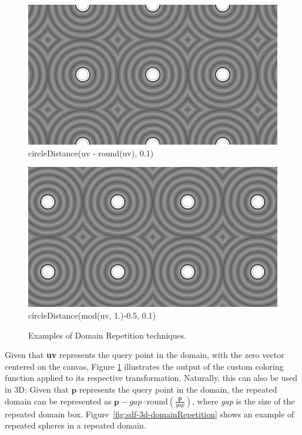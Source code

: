 \begin{figure}[h!]
    \begin{minipage}{0.45\textwidth}
        \centering
        \includegraphics[width=\linewidth]{imagens/domainRepetition-round.png}\\
        circleDistance(uv - round(uv), 0.1)
    \end{minipage}%
    \hfill
    \begin{minipage}{0.45\textwidth}
        \centering
        \includegraphics[width=\linewidth]{imagens/domainRepetition-mod.png}\\
        circleDistance(mod(uv, 1.)-0.5, 0.1)
    \end{minipage}

    \caption{Examples of Domain Repetition techniques.}
    \label{fig:domainRepetition}
\end{figure}

Given that \textbf{uv} represents the query point in the domain, with the zero vector centered on the canvas, Figure \ref{fig:domainRepetition} illustrates the output of the custom coloring function applied to its respective transformation. Naturally, this can also be used in 3D: Given that $\mathbf{p}$ represents the query point in the domain, the repeated domain can be represented as 
$\mathbf{p} - \textit{gap} \cdot \mathrm{round}\!\left( \frac{\mathbf{p}}{\textit{gap}} \right)$,
where \textit{gap} is the size of the repeated domain box. Figure~\ref{fig:sdf-3d-domainRepetition} 
shows an example of repeated spheres in a repeated domain.

